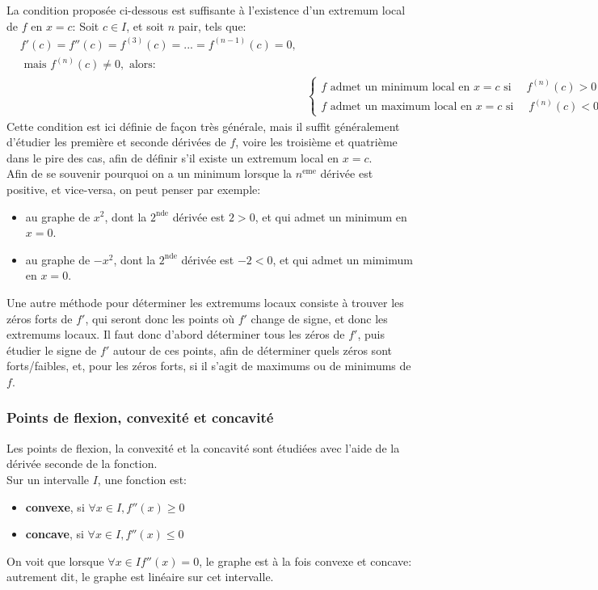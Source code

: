 \documentclass{article}
\numberwithin{equation}{subsection}
\begin{document}
La condition proposée ci-dessous est suffisante à l'existence d'un extremum local de \(f\) en \(x = c\):
Soit \(c \in I\), et soit \(n\) pair, tels que:
\begin{align*}
	&f'(c) = f''(c) = f^{(3)}(c) = ... = f^{(n-1)}(c) = 0, \\ 
	&\text{ mais } f^{(n)}(c) \neq 0, \text{ alors:} \\
	& &\begin{cases}
		f \text{ admet un minimum local en } x = c \text{ si } \quad f^{(n)}(c) > 0  \\
		f \text{ admet un maximum local en } x = c \text{ si } \quad f^{(n)}(c) < 0  
	\end{cases}
\end{align*}
Cette condition est ici définie de façon très générale, mais il suffit généralement d'étudier les première et seconde dérivées de \(f\), voire les troisième et quatrième dans le pire des cas, afin de définir s'il existe un extremum local en \(x = c\). \\
Afin de se souvenir pourquoi on a un minimum lorsque la \(n^\text{eme}\) dérivée est positive, et vice-versa, on peut penser par exemple:
\begin{itemize}
	\item au graphe de \(x^2\), dont la \(2^\text{nde}\) dérivée est \(2 > 0\), et qui admet un minimum en \(x = 0\).
	\item au graphe de \(-x^2\), dont la \(2^\text{nde}\) dérivée est  \(-2 < 0\), et qui admet un mimimum en \(x = 0\).
\end{itemize}

Une autre méthode pour déterminer les extremums locaux consiste à trouver les zéros forts de \(f'\), qui seront donc les points où \(f'\) change de signe, et donc les extremums locaux. Il faut donc d'abord déterminer tous les zéros de \(f'\), puis étudier le signe de \(f'\) autour de ces points, afin de déterminer quels zéros sont forts/faibles, et, pour les zéros forts, si il s'agit de maximums ou de minimums de \(f\).

\subsubsection{Points de flexion, convexité et concavité}
Les points de flexion, la convexité et la concavité sont étudiées avec l'aide de la dérivée seconde de la fonction. \\

Sur un intervalle \(I\), une fonction est:
\begin{itemize}
	\item \textbf{convexe}, si \(\forall x \in I, f''(x) \geq 0\)
	\item \textbf{concave}, si \(\forall x \in I, f''(x) \leq 0\)
\end{itemize}
On voit que lorsque \(\forall x \in I f''(x) = 0\), le graphe est à la fois convexe et concave: autrement dit, le graphe est linéaire sur cet intervalle.
\end{document}
